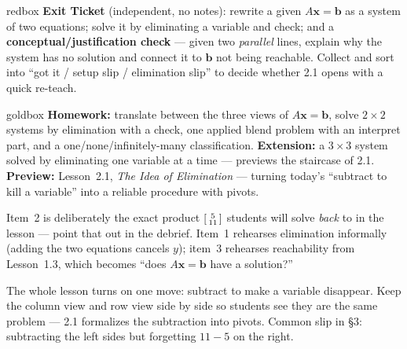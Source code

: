 \documentclass[10pt]{article}
\newcommand{\xx}{\mathbf{x}}
\newcommand{\bb}{\mathbf{b}}
\begin{document}
\begin{skillbox}{redbox}
\textbf{Exit Ticket} (independent, no notes): rewrite a given $A\xx=\bb$ as a system of two
equations; solve it by eliminating a variable and check; and a \textbf{conceptual/justification
check} --- given two \emph{parallel} lines, explain why the system has no solution and connect it
to $\bb$ not being reachable. Collect and sort into ``got it / setup slip / elimination slip'' to
decide whether 2.1 opens with a quick re-teach.
\end{skillbox}

\begin{skillbox}{goldbox}
\textbf{Homework:} translate between the three views of $A\xx=\bb$, solve $2\times 2$ systems by
elimination with a check, one applied blend problem with an interpret part, and a
one/none/infinitely-many classification. \textbf{Extension:} a $3\times 3$ system solved by
eliminating one variable at a time --- previews the staircase of 2.1. \textbf{Preview:}
Lesson~2.1, \emph{The Idea of Elimination} --- turning today's ``subtract to kill a variable''
into a reliable procedure with pivots.
\end{skillbox}

\begin{teachernote}[Warm-Up]
Item~2 is deliberately the exact product $\begin{bsmallmatrix} 5\\11 \end{bsmallmatrix}$ students
will solve \emph{back} to in the lesson --- point that out in the debrief. Item~1 rehearses
elimination informally (adding the two equations cancels $y$); item~3 rehearses reachability from
Lesson~1.3, which becomes ``does $A\xx=\bb$ have a solution?''
\end{teachernote}

\begin{teachernote}
The whole lesson turns on one move: subtract to make a variable disappear. Keep the column view
and row view side by side so students see they are the same problem --- 2.1 formalizes the
subtraction into pivots. Common slip in \S3: subtracting the left sides but forgetting $11-5$ on
the right.
\end{teachernote}
\end{document}
